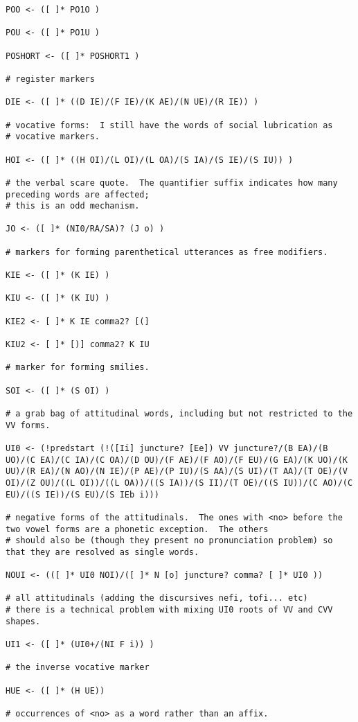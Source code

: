 \documentclass{article}
\begin{document}
\begin{verbatim}
POO <- ([ ]* PO1O )

POU <- ([ ]* PO1U )

POSHORT <- ([ ]* POSHORT1 )

# register markers 

DIE <- ([ ]* ((D IE)/(F IE)/(K AE)/(N UE)/(R IE)) )

# vocative forms:  I still have the words of social lubrication as 
# vocative markers.

HOI <- ([ ]* ((H OI)/(L OI)/(L OA)/(S IA)/(S IE)/(S IU)) )

# the verbal scare quote.  The quantifier suffix indicates how many preceding words are affected;
# this is an odd mechanism.

JO <- ([ ]* (NI0/RA/SA)? (J o) )

# markers for forming parenthetical utterances as free modifiers.

KIE <- ([ ]* (K IE) )

KIU <- ([ ]* (K IU) )

KIE2 <- [ ]* K IE comma2? [(]

KIU2 <- [ ]* [)] comma2? K IU

# marker for forming smilies.

SOI <- ([ ]* (S OI) )

# a grab bag of attitudinal words, including but not restricted to the VV forms.

UI0 <- (!predstart (!([Ii] juncture? [Ee]) VV juncture?/(B EA)/(B UO)/(C EA)/(C IA)/(C OA)/(D OU)/(F AE)/(F AO)/(F EU)/(G EA)/(K UO)/(K UU)/(R EA)/(N AO)/(N IE)/(P AE)/(P IU)/(S AA)/(S UI)/(T AA)/(T OE)/(V OI)/(Z OU)/((L OI))/((L OA))/((S IA))/(S II)/(T OE)/((S IU))/(C AO)/(C EU)/((S IE))/(S EU)/(S IEb i)))

# negative forms of the attitudinals.  The ones with <no> before the two vowel forms are a phonetic exception.  The others
# should also be (though they present no pronunciation problem) so that they are resolved as single words.

NOUI <- (([ ]* UI0 NOI)/([ ]* N [o] juncture? comma? [ ]* UI0 ))

# all attitudinals (adding the discursives nefi, tofi... etc)
# there is a technical problem with mixing UI0 roots of VV and CVV shapes.

UI1 <- ([ ]* (UI0+/(NI F i)) )

# the inverse vocative marker

HUE <- ([ ]* (H UE))

# occurrences of <no> as a word rather than an affix.


\end{verbatim}
\end{document}
